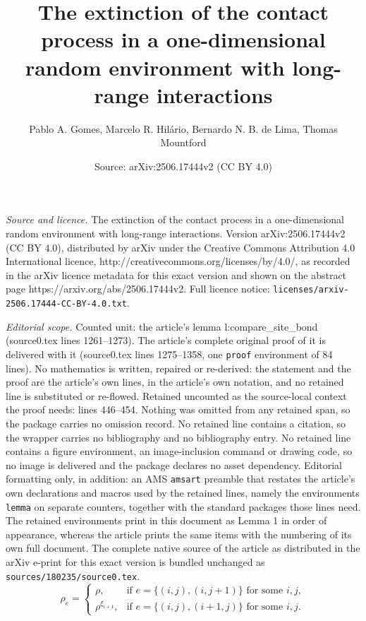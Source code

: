 \documentclass[10pt,a4paper]{amsart}
\title{The extinction of the contact process in a one-dimensional random environment with long-range interactions}
\author{Pablo A. Gomes, Marcelo R. Hil\'ario, Bernardo N. B. de Lima, Thomas Mountford}
\date{Source: arXiv:2506.17444v2 (CC BY 4.0)}
\begin{document}
\maketitle

\noindent\emph{Source and licence.} The extinction of the contact process in a one-dimensional random environment with long-range interactions. Version arXiv:2506.17444v2 (CC BY 4.0), distributed by arXiv under the Creative Commons Attribution 4.0 International licence, http://creativecommons.org/licenses/by/4.0/, as recorded in the arXiv licence metadata for this exact version and shown on the abstract page https://arxiv.org/abs/2506.17444v2. Full licence notice: \texttt{licenses/arxiv-2506.17444-CC-BY-4.0.txt}.\par\smallskip

\noindent\textit{Editorial scope.} Counted unit: the article's lemma l:compare\_site\_bond (source0.tex lines 1261--1273). The article's complete original proof of it is delivered with it (source0.tex lines 1275--1358, one \texttt{proof} environment of 84 lines). No mathematics is written, repaired or re-derived: the statement and the proof are the article's own lines, in the article's own notation, and no retained line is substituted or re-flowed.  Retained uncounted as the source-local context the proof needs: lines 446--454.  Nothing was omitted from any retained span, so the package carries no omission record.  No retained line contains a citation, so the wrapper carries no bibliography and no bibliography entry.  No retained line contains a figure environment, an image-inclusion command or drawing code, so no image is delivered and the package declares no asset dependency.  Editorial formatting only, in addition: an AMS \texttt{amsart} preamble that restates the article's own declarations and macros used by the retained lines, namely the environments \texttt{lemma} on separate counters, together with the standard packages those lines need.  The retained environments print in this document as Lemma 1 in order of appearance, whereas the article prints the same items with the numbering of its own full document.  The complete native source of the article as distributed in the arXiv e-print for this exact version is bundled unchanged as \texttt{sources/180235/source0.tex}.
\begin{equation}
\label{e:def_perc_stret}
\rho_e = \left\{
\begin{array}{ll}
\rho, & \text{if } e = \{(i, j), (i, j+1)\} \text{ for some } i, j, \\
\rho^{\xi_{i+1}}, & \text{if } e = \{(i, j), (i+1, j)\} \text{ for some } i, j.
\end{array}
\right.
\end{equation}
\end{document}
